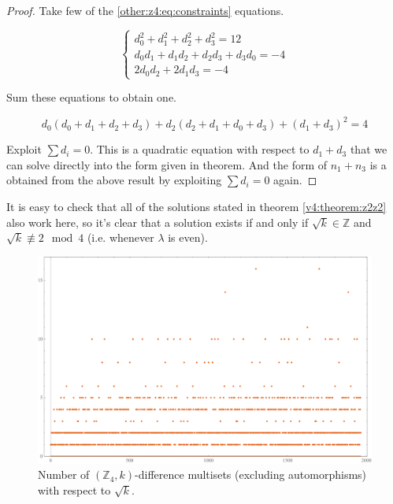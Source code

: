 \documentclass{article}
\theoremstyle{plain}
\theoremstyle{definition}
\theoremstyle{remark}
\begin{document}
			\begin{proof}
				Take few of the \eqref{other:z4:eq:constraints} equations.
				
				\begin{equation}
					\begin{cases}
						d_0^2 + d_1^2 + d_2^2 + d_3^2 = 12 \\
						d_0 d_1 + d_1 d_2 + d_2 d_3 + d_3 d_0 = -4 \\
						2 d_0 d_2 + 2 d_1 d_3 = -4
					\end{cases}
				\end{equation}
				
				Sum these equations to obtain one.
				
				\begin{equation}
					d_0 (d_0+d_1+d_2+d_3) + d_2 (d_2 + d_1 + d_0 + d_3) + (d_1 + d_3)^2 = 4
				\end{equation}
				
				Exploit $\sum d_i = 0$.	This is a quadratic equation with respect to $d_1+d_3$ that we can solve directly into the form given in theorem. And the form of $n_1+n_3$ is a obtained from the above result by exploiting $\sum d_i = 0$ again.
			\end{proof}
			
			It is easy to check that all of the solutions stated in theorem \ref{v4:theorem:z2z2} also work here, so it's clear that a solution exists if and only if $\sqrt k \in \mathbb Z$ and $\sqrt k \not\equiv 2 \mod 4$ (i.e. whenever $\lambda$ is even).
			
			\begin{figure}
				\includegraphics[width=\textwidth]{z4}
				\caption{Number of $(\mathbb Z_4, k)$-difference multisets (excluding automorphisms) with respect to $\sqrt k$.}
				\label{other:z4:figure:results}
			\end{figure}
			
\end{document}
